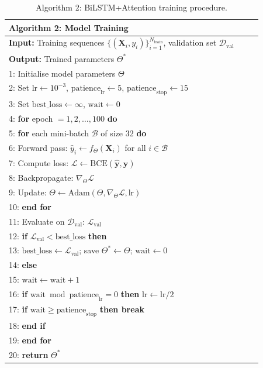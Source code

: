 \begin{table}[H]
\centering
\caption{Algorithm 2: BiLSTM+Attention training procedure.}
\label{alg:training}
\footnotesize
\begin{tabular}{p{0.92\linewidth}}
\toprule
\textbf{Algorithm 2:} Model Training \\
\midrule
\textbf{Input:} Training sequences $\{(\mathbf{X}_i, y_i)\}_{i=1}^{N_\text{train}}$, validation set $\mathcal{D}_\text{val}$ \\
\textbf{Output:} Trained parameters $\Theta^*$ \\
\midrule
1: Initialise model parameters $\Theta$ \\
2: Set $\text{lr} \leftarrow 10^{-3}$, $\text{patience}_\text{lr} \leftarrow 5$, $\text{patience}_\text{stop} \leftarrow 15$ \\
3: Set $\text{best\_loss} \leftarrow \infty$, $\text{wait} \leftarrow 0$ \\
4: \textbf{for} epoch $= 1, 2, \ldots, 100$ \textbf{do} \\
5: \quad \textbf{for} each mini-batch $\mathcal{B}$ of size 32 \textbf{do} \\
6: \quad\quad Forward pass: $\hat{y}_i \leftarrow f_\Theta(\mathbf{X}_i)$ for all $i \in \mathcal{B}$ \\
7: \quad\quad Compute loss: $\mathcal{L} \leftarrow \text{BCE}(\hat{\mathbf{y}}, \mathbf{y})$ \\
8: \quad\quad Backpropagate: $\nabla_\Theta \mathcal{L}$ \\
9: \quad\quad Update: $\Theta \leftarrow \text{Adam}(\Theta, \nabla_\Theta \mathcal{L}, \text{lr})$ \\
10: \quad \textbf{end for} \\
11: \quad Evaluate on $\mathcal{D}_\text{val}$: $\mathcal{L}_\text{val}$ \\
12: \quad \textbf{if} $\mathcal{L}_\text{val} < \text{best\_loss}$ \textbf{then} \\
13: \quad\quad $\text{best\_loss} \leftarrow \mathcal{L}_\text{val}$; save $\Theta^* \leftarrow \Theta$; $\text{wait} \leftarrow 0$ \\
14: \quad \textbf{else} \\
15: \quad\quad $\text{wait} \leftarrow \text{wait} + 1$ \\
16: \quad\quad \textbf{if} $\text{wait} \bmod \text{patience}_\text{lr} = 0$ \textbf{then} $\text{lr} \leftarrow \text{lr} / 2$ \\
17: \quad\quad \textbf{if} $\text{wait} \geq \text{patience}_\text{stop}$ \textbf{then break} \\
18: \quad \textbf{end if} \\
19: \textbf{end for} \\
20: \textbf{return} $\Theta^*$ \\
\bottomrule
\end{tabular}
\end{table}

